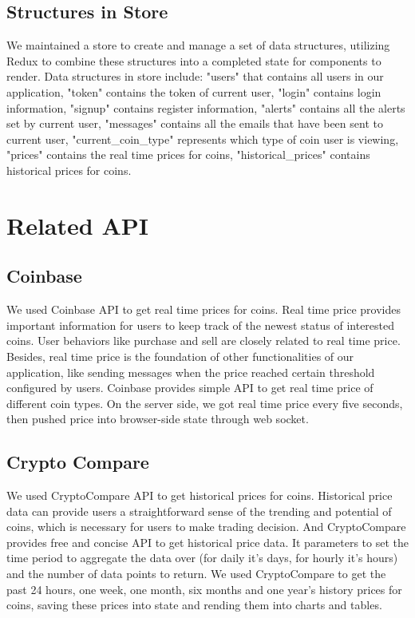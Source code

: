 \subsection{Structures in Store}
We maintained a store to create and manage a set of data structures, 
utilizing Redux to combine these structures into a completed state 
for components to render. Data structures in store include: "users" 
that contains all users in our application, "token" contains the 
token of current user, "login" contains login information, "signup" 
contains register information, "alerts" contains all the alerts set 
by current user, "messages" contains all the emails that have been 
sent to current user, "current\_coin\_type" represents which type of 
coin user is viewing, "prices" contains the real time prices for 
coins, "historical\_prices" contains historical prices for coins.



\section{Related API}
\subsection{Coinbase}
We used Coinbase API to get real time prices for coins. Real 
time price provides important information for users to keep 
track of the newest status of interested coins. User behaviors 
like purchase and sell are closely related to real time price. 
Besides, real time price is the foundation of other functionalities 
of our application, like sending messages when the price reached 
certain threshold configured by users. Coinbase provides simple 
API to get real time price of different coin types. On the server 
side, we got real time price every five seconds, then pushed price 
into browser-side state through web socket.


\subsection{Crypto Compare}
We used CryptoCompare API to get historical prices for coins. 
Historical price data can provide users a straightforward sense 
of the trending and potential of coins, which is necessary for 
users to make trading decision. And CryptoCompare provides free 
and concise API to get historical price data. It parameters to 
set the time period to aggregate the data over (for daily it's 
days, for hourly it's hours) and the number of data points to 
return. We used CryptoCompare to get the past 24 hours, one week, 
one month, six months and one year's history prices for coins, 
saving these prices into state and rending them into charts and tables.
